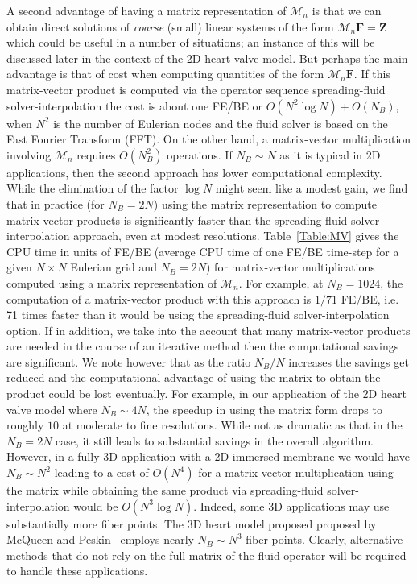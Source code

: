\documentclass[preprint,12pt]{elsarticle}
\begin{document}
 A second advantage of having a matrix representation of $\mathcal{M}_n$ is that we can obtain direct solutions of {\em coarse} (small) linear systems of the form $\mathcal{M}_n\mathbf{F}=\mathbf{Z}$ which could be useful in a number of situations; an instance of this will be discussed later in the context of the 2D heart valve model. But perhaps the main advantage is that of cost when 
 computing quantities of the form  $\mathcal{M}_n\mathbf{F}$.  If this matrix-vector product is computed via the operator sequence  spreading-fluid solver-interpolation the cost is about one FE/BE or $O(N^2\log N) + O(N_B)$, when $N^2$ is the number of Eulerian nodes and the fluid solver is based on the Fast Fourier Transform (FFT).  
 On the other hand, a matrix-vector multiplication involving $\mathcal{M}_n$ requires $O(N_B^2)$ operations.  If  $N_B \sim N$ as it is typical in 2D applications, then the second approach has lower computational complexity. While
 the elimination of the factor $\log N$ might seem like a modest gain, we find that in practice (for $N_B=2N$) using the 
 matrix representation to compute matrix-vector products is significantly faster  than the spreading-fluid solver-interpolation approach, even at modest resolutions.  Table~\ref{Table:MV} gives the CPU time in units of FE/BE (average CPU time of one FE/BE time-step for a given $N\times N$ Eulerian grid and $N_B=2N$) for matrix-vector multiplications computed using a matrix representation of  $\mathcal{M}_n$.  For example, at $N_B=1024$,  the computation of a matrix-vector product with this approach is $1/71$ FE/BE, i.e.
  71 times faster than it would be using the spreading-fluid solver-interpolation option.
  If in addition,  we take into the account that many matrix-vector products are needed in the course of an iterative method then the computational savings are significant. We note however that as the ratio $N_B/N$ increases the savings get reduced and the computational advantage of using the matrix to obtain the product could be lost eventually. For example, in our application of the 2D heart valve model where $N_B  \sim 4N$, the speedup in using the matrix form drops to roughly $10$ at moderate to fine resolutions. While not as dramatic as that in the $N_B=2N$ case, it still leads to substantial savings in the overall algorithm. 
   However,  in a fully 3D application with a 2D immersed membrane we would have $N_B \sim N^2$ leading to a cost of  $O(N^4)$ for 
   a matrix-vector multiplication using the matrix  while obtaining the same product via spreading-fluid solver-interpolation would be $O(N^3\log N)$. Indeed, some 3D applications may use substantially more fiber points. The 3D heart model proposed proposed by McQueen and Peskin~\cite{McQueenPeskin2000} employs nearly $N_B  \sim N^3$ fiber points. Clearly,  alternative methods that do not rely on the full matrix of the fluid operator will be required to handle these applications.
  
\end{document}
